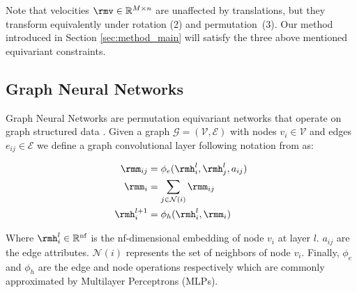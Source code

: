 Note that velocities $\rmv 
\in \mathbb{R}^{M \times n}$ are unaffected by translations, but they transform equivalently under rotation (2) and permutation~(3). Our method introduced in Section \ref{sec:method_main} will satisfy the three above mentioned equivariant constraints. 

\subsection{Graph Neural Networks}
\label{sec:background_gnn}
Graph Neural Networks are permutation equivariant networks that operate on graph structured data \cite{bruna2013spectral, defferrard2016convolutional, kipf2016semi}. Given a graph $\mathcal{G} = (\mathcal{V}, \mathcal{E})$ with nodes $v_i \in \mathcal{V}$ and edges $e_{ij} \in \mathcal{E}$ we define a graph convolutional layer following notation from \cite{gilmer2017neural} as:

\begin{equation} \label{eq:gnn}
\begin{aligned}
\rmm_{ij} &= \phi_e(\rmh_i^l, \rmh_j^l, a_{ij}) \\
    \rmm_i &= \sum_{j \in \mathcal{N}(i)} \rmm_{i j} \\
    \rmh_i^{l+1} &= \phi_h(\rmh_i^l, \rmm_i) \\
\end{aligned}
\end{equation}

Where $\rmh_i^l \in \mathbb{R}^{\text{nf}}$ is the nf-dimensional embedding of node $v_i$ at layer $l$. $a_{ij}$ are the edge attributes. $\mathcal{N}(i)$ represents the set of neighbors of node $v_i$. Finally, $\phi_e$ and $\phi_h$ are the edge and node operations respectively which are commonly approximated by Multilayer Perceptrons (MLPs).